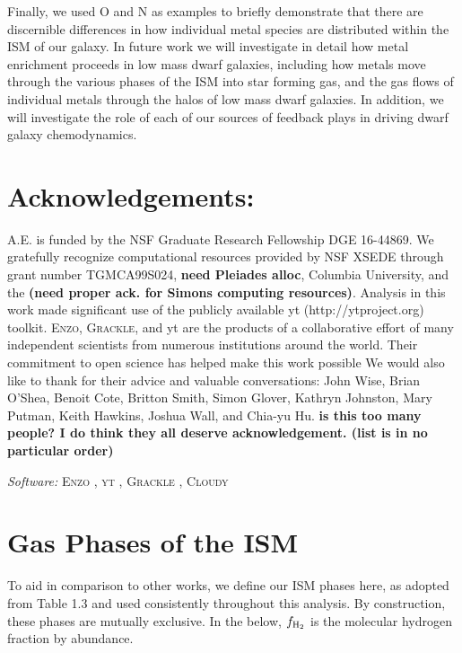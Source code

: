 \documentclass[twocolumn]{aastex61}
\begin{document}
Finally, we used O and N as examples to briefly demonstrate that there are discernible differences in how individual metal species are distributed within the ISM of our galaxy. In future work we will investigate in detail how metal enrichment proceeds in low mass dwarf galaxies, including how metals move through the various phases of the ISM into star forming gas, and the gas flows of individual metals through the halos of low mass dwarf galaxies. In addition, we will investigate the role of each of our sources of feedback plays in driving dwarf galaxy chemodynamics.

\section*{Acknowledgements:} A.E. is funded by the NSF Graduate Research Fellowship DGE 16-44869. 
We gratefully recognize computational
resources provided by NSF XSEDE through grant number TGMCA99S024, \textbf{need Pleiades alloc}, Columbia University, and the \textbf{(need proper ack. for Simons computing resources)}. Analysis in this work
made significant use of the publicly available yt (http://ytproject.org)
toolkit. \textsc{Enzo}, \textsc{Grackle}, and yt are the products of a collaborative effort of many independent scientists from numerous institutions around
the world. Their commitment to open science has helped make
this work possible
We would also like to thank for their advice and valuable conversations: John Wise, Brian O'Shea, Benoit Cote, Britton Smith, Simon Glover, Kathryn Johnston, Mary Putman, Keith Hawkins, Joshua Wall, and Chia-yu Hu. \textbf{is this too many people? I do think they all deserve acknowledgement. (list is in no particular order)}

\textit{Software:} \textsc{Enzo} \citep{Enzo2014}, \textsc{yt} \citep{yt}, \textsc{Grackle} \citep{GrackleMethod}, \textsc{Cloudy} \citep{Cloudy2013}
%
%




\appendix
\renewcommand\thefigure{\thesection.\arabic{figure}}    
\setcounter{figure}{0}

\section{Gas Phases of the ISM}
\label{appendix:phases}

To aid in comparison to other works, we define our ISM phases here, as adopted from \citet{Draine2011} Table 1.3 and used consistently throughout this analysis. By construction, these phases are mutually exclusive. In the below, $f_{\rm H_2}$ is the molecular hydrogen fraction by abundance.
\end{document}
